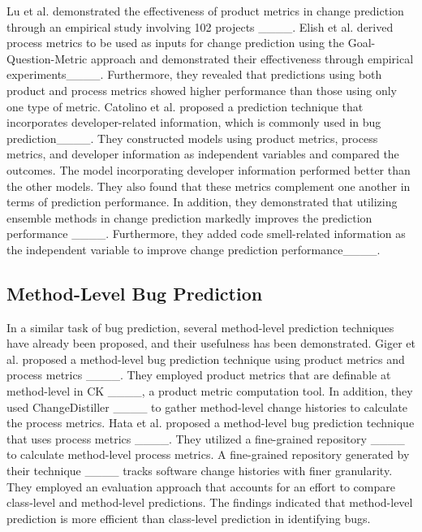 Lu et al. demonstrated the effectiveness of product metrics in change prediction through an empirical study involving 102 projects ____.
Elish et al. derived process metrics to be used as inputs for change prediction using the Goal-Question-Metric approach and demonstrated their effectiveness through empirical experiments____. 
Furthermore, they revealed that predictions using both product and process metrics showed higher performance than those using only one type of metric.
Catolino et al. proposed a prediction technique that incorporates developer-related information, which is commonly used in bug prediction____.
They constructed models using product metrics, process metrics, and developer information as independent variables and compared the outcomes.
The model incorporating developer information performed better than the other models.
They also found that these metrics complement one another in terms of prediction performance.
In addition, they demonstrated that utilizing ensemble methods in change prediction markedly improves the prediction performance ____.
Furthermore, they added code smell-related information as the independent variable to improve change prediction performance____.

\subsection{Method-Level Bug Prediction}
In a similar task of bug prediction, several method-level prediction techniques have already been proposed, and their usefulness has been demonstrated.
Giger et al. proposed a method-level bug prediction technique using product metrics and process metrics ____. 
They employed product metrics that are definable at method-level in CK ____, a product metric computation tool. 
In addition, they used ChangeDistiller ____ to gather method-level change histories to calculate the process metrics.
Hata et al. proposed a method-level bug prediction technique that uses process metrics ____. 
They utilized a fine-grained repository ____ to calculate method-level process metrics.
A fine-grained repository generated by their technique ____ tracks software change histories with finer granularity.
They employed an evaluation approach that accounts for an effort to compare class-level and method-level predictions.
The findings indicated that method-level prediction is more efficient than class-level prediction in identifying bugs. 

